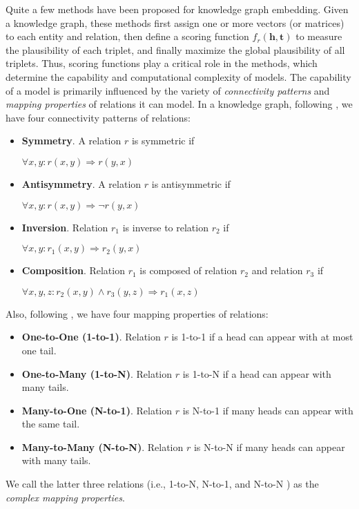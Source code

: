 \documentclass[conference]{IEEEtran}
\begin{document}
Quite a few methods \cite{TransE,ComplEx,ConvE,RotatE,paths,simple} have been proposed for knowledge graph embedding. Given a knowledge graph, these methods first assign one or more vectors (or matrices) to each entity and relation, then define a scoring function $f_{r}(\bm{h},\bm{t})$ to measure the plausibility of each triplet, and finally maximize the global plausibility of all triplets. Thus, scoring functions play a critical role in the methods, which determine the capability and computational complexity of models. The capability of a model is primarily influenced by the variety of \textit{connectivity patterns} and \textit{mapping properties} of relations it can model. In a knowledge graph, following \cite{RotatE}, we have four connectivity patterns of relations:
\begin{itemize}
	\item \textbf{Symmetry}. A relation $r$ is symmetric if
	\begin{center}
		$\forall x, y: r(x,y) \Rightarrow r(y,x)$
	\end{center}
	\item \textbf{Antisymmetry}. A relation $r$ is antisymmetric if 
	\begin{center}
		$\forall x, y: r(x,y) \Rightarrow \neg r(y,x)$
	\end{center}
	\item \textbf{Inversion}. Relation $r_{1}$ is inverse to relation $r_{2}$ if
	\begin{center}
		$\forall x, y: r_{1}(x,y) \Rightarrow r_{2}(y,x)$
	\end{center}
	\item \textbf{Composition}. Relation $r_{1}$ is composed of relation $r_{2}$ and relation $r_{3}$ if
	\begin{center}
		$\forall x, y, z: r_{2}(x,y) \wedge r_{3}(y,z) \Rightarrow r_{1}(x,z)$
	\end{center}
\end{itemize}
Also, following \cite{TransE}, we have four mapping properties of relations:
\begin{itemize}
	\item \textbf{One-to-One (1-to-1)}. Relation $r$ is 1-to-1 if a head can appear with at most one tail.
	\item \textbf{One-to-Many (1-to-N)}. Relation $r$ is 1-to-N if a head can appear with many tails.
	\item \textbf{Many-to-One (N-to-1)}. Relation $r$ is N-to-1 if many heads can appear with the same tail.
	\item \textbf{Many-to-Many (N-to-N)}. Relation $r$ is N-to-N if many heads can appear with many tails.
\end{itemize}
We call the latter three relations (i.e., 1-to-N, N-to-1, and N-to-N ) as the \textit{complex mapping properties}.
\end{document}
